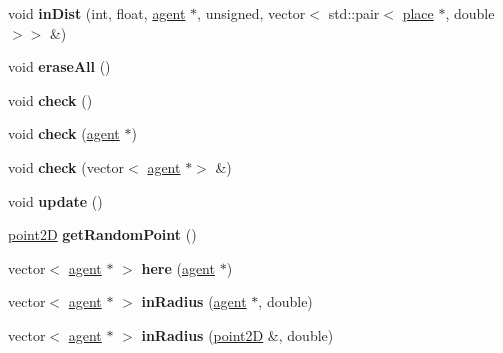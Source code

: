 \begin{DoxyCompactItemize}
\item 
\mbox{\label{classsearchGrid_a0b410acf9c8c7e1fb394538a978558f9}} 
void {\bfseries in\+Dist} (int, float, \mbox{\hyperlink{classagent}{agent}} $\ast$, unsigned, vector$<$ std\+::pair$<$ \mbox{\hyperlink{classplace}{place}} $\ast$, double $>$$>$ \&)
\item 
\mbox{\label{classsearchGrid_a4b265b6f595070c5aa53e8c9be4cdcc3}} 
void {\bfseries erase\+All} ()
\item 
\mbox{\label{classsearchGrid_af88dcb0059b356e4589f07fc7789a829}} 
void {\bfseries check} ()
\item 
\mbox{\label{classsearchGrid_ab1753e98c052effea4ff86976648a34e}} 
void {\bfseries check} (\mbox{\hyperlink{classagent}{agent}} $\ast$)
\item 
\mbox{\label{classsearchGrid_a60d9100d9505f9683d0e81a5a2394bef}} 
void {\bfseries check} (vector$<$ \mbox{\hyperlink{classagent}{agent}} $\ast$$>$ \&)
\item 
\mbox{\label{classsearchGrid_a4318a1602cc5f146f8c181b827578888}} 
void {\bfseries update} ()
\item 
\mbox{\label{classsearchGrid_afec32e1fa615155a897d734c1bf7a27f}} 
\mbox{\hyperlink{classpoint2D}{point2D}} {\bfseries get\+Random\+Point} ()
\item 
\mbox{\label{classsearchGrid_a8695b1f2b62492cbe41083ac8d3758fb}} 
vector$<$ \mbox{\hyperlink{classagent}{agent}} $\ast$ $>$ {\bfseries here} (\mbox{\hyperlink{classagent}{agent}} $\ast$)
\item 
\mbox{\label{classsearchGrid_a99945ae6845a2e1074062e869c69c3e2}} 
vector$<$ \mbox{\hyperlink{classagent}{agent}} $\ast$ $>$ {\bfseries in\+Radius} (\mbox{\hyperlink{classagent}{agent}} $\ast$, double)
\item 
\mbox{\label{classsearchGrid_a5f099f276a7e931e479d0eeac489f512}} 
vector$<$ \mbox{\hyperlink{classagent}{agent}} $\ast$ $>$ {\bfseries in\+Radius} (\mbox{\hyperlink{classpoint2D}{point2D}} \&, double)

\end{DoxyCompactItemize}
